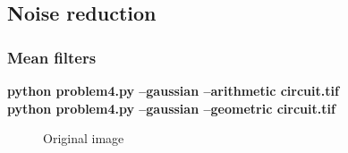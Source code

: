\pagebreak
\subsection{Noise reduction}

\subsubsection{Mean filters}

\begin{minipage}{\textwidth}
\textbf{python problem4.py --gaussian --arithmetic circuit.tif} \\
\textbf{python problem4.py --gaussian --geometric circuit.tif} \\
\end{minipage}

\begin{figure}[!htb]\centering
    \begin{minipage}{0.45\textwidth}
        \caption{\small{Original image}}
    \end{minipage}
    \begin{minipage}{0.45\textwidth}

\end{minipage}
\end{figure}
